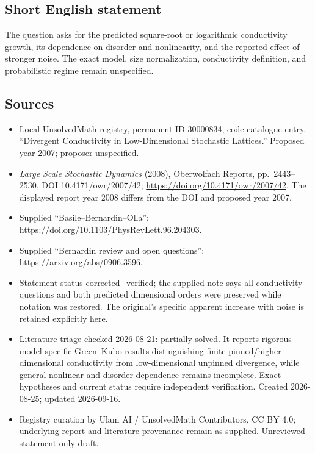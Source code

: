 \documentclass[11pt]{article}
\begin{document}
\subsection{Short English statement}
The question asks for the predicted square-root or logarithmic conductivity growth, its dependence on disorder and nonlinearity, and the reported effect of stronger noise. The exact model, size normalization, conductivity definition, and probabilistic regime remain unspecified.
\subsection{Sources}
\begin{itemize}
\item Local UnsolvedMath registry, permanent ID 30000834, code catalogue entry, ``Divergent Conductivity in Low-Dimensional Stochastic Lattices.'' Proposed year 2007; proposer unspecified.
\item \emph{Large Scale Stochastic Dynamics} (2008), Oberwolfach Reports, pp.\ 2443--2530, DOI 10.4171/owr/2007/42; \url{https://doi.org/10.4171/owr/2007/42}. The displayed report year 2008 differs from the DOI and proposed year 2007.
\item Supplied ``Basile--Bernardin--Olla'': \url{https://doi.org/10.1103/PhysRevLett.96.204303}.
\item Supplied ``Bernardin review and open questions'': \url{https://arxiv.org/abs/0906.3596}.
\item Statement status corrected\_verified; the supplied note says all conductivity questions and both predicted dimensional orders were preserved while notation was restored. The original's specific apparent increase with noise is retained explicitly here.
\item Literature triage checked 2026-08-21: partially solved. It reports rigorous model-specific Green--Kubo results distinguishing finite pinned/higher-dimensional conductivity from low-dimensional unpinned divergence, while general nonlinear and disorder dependence remains incomplete. Exact hypotheses and current status require independent verification. Created 2026-08-25; updated 2026-09-16.
\item Registry curation by Ulam AI / UnsolvedMath Contributors, CC BY 4.0; underlying report and literature provenance remain as supplied. Unreviewed statement-only draft.
\end{itemize}
\end{document}

